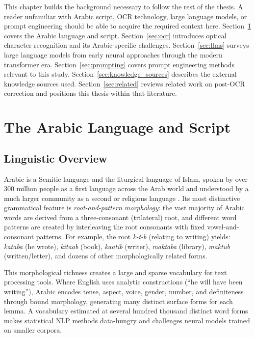 \setlength{\parskip}{0.5\baselineskip}

This chapter builds the background necessary to follow the rest of the thesis.
A reader unfamiliar with Arabic script, OCR technology, large language models,
or prompt engineering should be able to acquire the required context here.
Section~\ref{sec:arabic} covers the Arabic language and script.
Section~\ref{sec:ocr} introduces optical character recognition and its
Arabic-specific challenges.
Section~\ref{sec:llms} surveys large language models from early neural approaches
through the modern transformer era.
Section~\ref{sec:prompting} covers prompt engineering methods relevant to this
study.
Section~\ref{sec:knowledge_sources} describes the external knowledge sources
used.
Section~\ref{sec:related} reviews related work on post-OCR correction and
positions this thesis within that literature.

\section{The Arabic Language and Script}
\label{sec:arabic}

\subsection{Linguistic Overview}
\label{subsec:arabic_linguistic}

Arabic is a Semitic language and the liturgical language of Islam, spoken by
over 300 million people as a first language across the Arab world and
understood by a much larger community as a second or religious language
\cite{holes2004modern}.
Its most distinctive grammatical feature is \emph{root-and-pattern morphology}:
the vast majority of Arabic words are derived from a three-consonant (trilateral)
root, and different word patterns are created by interleaving the root consonants
with fixed vowel-and-consonant patterns.
For example, the root \textit{k-t-b} (relating to writing) yields:
\textit{kataba} (he wrote), \textit{kitaab} (book), \textit{kaatib} (writer),
\textit{maktaba} (library), \textit{maktub} (written/letter), and dozens of
other morphologically related forms.

This morphological richness creates a large and sparse vocabulary for text
processing tools.
Where English uses analytic constructions (``he will have been writing''),
Arabic encodes tense, aspect, voice, gender, number, and definiteness
through bound morphology, generating many distinct surface forms for each
lemma.
A vocabulary estimated at several hundred thousand distinct word forms makes
statistical NLP methods data-hungry and challenges neural models trained on
smaller corpora.

